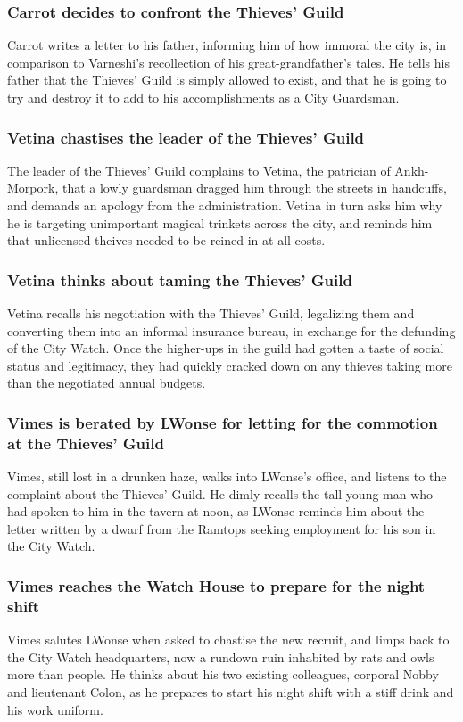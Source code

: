 \subsubsection{\Gls{Carrot} decides to confront the Thieves' Guild}
\Gls{Carrot} writes a letter to his father, informing him of how immoral the city is, in comparison
to \Gls{Varneshi}'s recollection of his great-grandfather's tales. He tells his father that the
Thieves' Guild is simply allowed to exist, and that he is going to try and destroy it to add to his
accomplishments as a City Guardsman.

\subsubsection{\Gls{Vetina} chastises the leader of the Thieves' Guild}
The leader of the Thieves' Guild complains to \Gls{Vetina}, the patrician of Ankh-Morpork, that a
lowly guardsman dragged him through the streets in handcuffs, and demands an apology from the
administration. \Gls{Vetina} in turn asks him why he is targeting unimportant magical trinkets
across the city, and reminds him that unlicensed theives needed to be reined in at all costs.

\subsubsection{\Gls{Vetina} thinks about taming the Thieves' Guild}
\Gls{Vetina} recalls his negotiation with the Thieves' Guild, legalizing them and converting them
into an informal insurance bureau, in exchange for the defunding of the City Watch. Once the
higher-ups in the guild had gotten a taste of social status and legitimacy, they had quickly
cracked down on any thieves taking more than the negotiated annual budgets.

\subsubsection{\Gls{Vimes} is berated by \Gls{LWonse} for letting for the commotion at the Thieves'
    Guild}
\Gls{Vimes}, still lost in a drunken haze, walks into \Gls{LWonse}'s office, and listens to the
complaint about the Thieves' Guild. He dimly recalls the tall young man who had spoken to him in the
tavern at noon, as \Gls{LWonse} reminds him about the letter written by a dwarf from the Ramtops
seeking employment for his son in the City Watch.

\subsubsection{\Gls{Vimes} reaches the Watch House to prepare for the night shift}
\Gls{Vimes} salutes \Gls{LWonse} when asked to chastise the new recruit, and limps back to the
City Watch headquarters, now a rundown ruin inhabited by rats and owls more than people. He thinks
about his two existing colleagues, corporal \Gls{Nobby} and lieutenant \Gls{Colon}, as he prepares
to start his night shift with a stiff drink and his work uniform.

